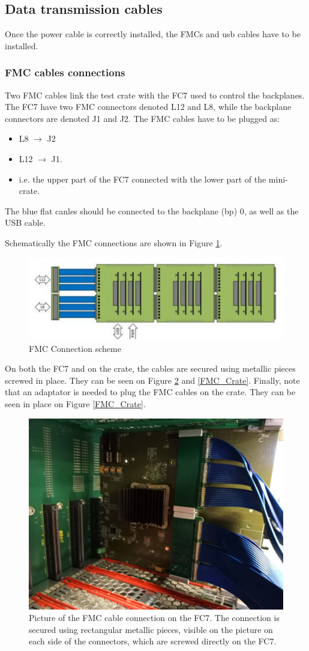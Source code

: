 \documentclass[10pt,a4paper]{article}
\begin{document}
\subsection{Data transmission cables}
Once the power cable is correctly installed, the FMCs and usb cables have to be installed.
\subsubsection{FMC cables connections}
Two FMC cables link the test crate with the FC7 used to control the backplanes. The FC7 have two FMC connectors denoted L12 and L8, while the backplane connectors are denoted J1 and J2. The FMC cables have to be plugged as:
\begin{itemize}
\item L8 $\rightarrow$ J2
\item L12 $\rightarrow$ J1.
\item i.e. the upper part of the FC7 connected with the lower part of the mini-crate.
\end{itemize}
The blue flat canles should be connected to the backplane (bp) 0, as well as the USB cable. 

Schematically the FMC connections are shown in Figure \ref{FMCConnection}.
\begin{figure}[h!]
 \includegraphics[width=\linewidth]{FMCScheme.png} 
  \caption{FMC Connection scheme}
  \label{FMCConnection}
\end{figure}

On both the FC7 and on the crate, the cables are secured using metallic pieces screwed in place. They can be seen on Figure \ref{FMC_FC7} and \ref{FMC_Crate}. Finally, note that an adaptator is needed to plug the FMC cables on the crate. They can be seen in place on Figure \ref{FMC_Crate}.

\begin{figure}[h!]
\centering
 \includegraphics[width=0.6\linewidth]{FMC_FC7.jpeg} 
  \caption{Picture of the FMC cable connection on the FC7. The connection is secured using rectangular metallic pieces, visible on the picture on each side of the connectors, which are screwed directly on the FC7.}
  \label{FMC_FC7}
\end{figure}
\end{document}
